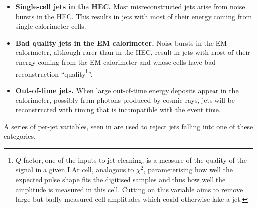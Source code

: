 \begin{itemize}
  \item \textbf{Single-cell jets in the HEC.} Most misreconstructed jets arise
    from noise bursts in the HEC. This results in jets with most of their energy
    coming from single calorimeter cells.
  \item \textbf{Bad quality jets in the EM calorimeter.} Noise bursts in the
    EM calorimeter, although rarer than in the HEC, result in jets with most of
    their energy coming from the EM calorimeter and whose cells have bad
    reconstruction ``quality\footnote{$Q$-factor, one of the inputs to jet cleaning,
                                      is a measure of the quality of the signal
                                      in a given LAr cell, analogous to $\chi^2$,
                                      parameterising how well the expected pulse
                                      shape fits the digitised samples and thus
                                      how well the amplitude is measured in this
                                      cell. Cutting on this variable aims to remove
                                      large but badly measured cell amplitudes which
                                      could otherwise fake a jet.}''.
  \item \textbf{Out-of-time jets.} When large out-of-time energy deposits appear
    in the calorimeter, possibly from photons produced by cosmic rays, jets will
    be reconstructed with timing that is incompatible with the event time.
\end{itemize}

A series of per-jet variables, seen in 
are used to reject jets falling into one of these categories.

